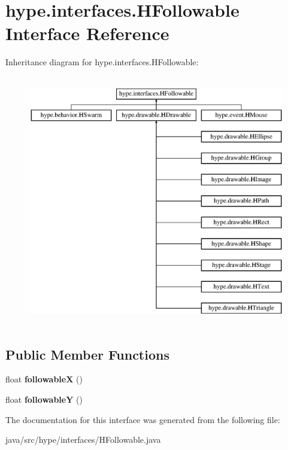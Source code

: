 \hypertarget{interfacehype_1_1interfaces_1_1_h_followable}{\section{hype.\-interfaces.\-H\-Followable Interface Reference}
\label{interfacehype_1_1interfaces_1_1_h_followable}
}
Inheritance diagram for hype.\-interfaces.\-H\-Followable\-:\begin{figure}[H]
\begin{center}
\leavevmode
\includegraphics[height=11.000000cm]{interfacehype_1_1interfaces_1_1_h_followable}
\end{center}
\end{figure}
\subsection*{Public Member Functions}
\begin{DoxyCompactItemize}
\item 
\hypertarget{interfacehype_1_1interfaces_1_1_h_followable_a40757a686c86c489cb2d65154a5a07a4}{float {\bfseries followable\-X} ()}\label{interfacehype_1_1interfaces_1_1_h_followable_a40757a686c86c489cb2d65154a5a07a4}

\item 
\hypertarget{interfacehype_1_1interfaces_1_1_h_followable_a765229ff54340b0acfd0ca83226dae1d}{float {\bfseries followable\-Y} ()}\label{interfacehype_1_1interfaces_1_1_h_followable_a765229ff54340b0acfd0ca83226dae1d}

\end{DoxyCompactItemize}


The documentation for this interface was generated from the following file\-:\begin{DoxyCompactItemize}
\item 
java/src/hype/interfaces/H\-Followable.\-java\end{DoxyCompactItemize}
